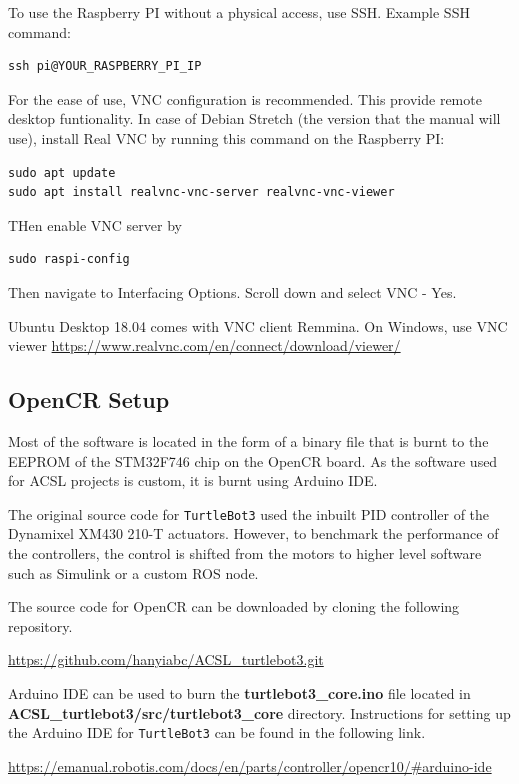 \documentclass[12]{article}
\begin{document}
To use the Raspberry PI without a physical access, use SSH. Example SSH command:

\begin{lstlisting}[style=bash]
ssh pi@YOUR_RASPBERRY_PI_IP
\end{lstlisting}

For the ease of use, VNC configuration is recommended. This provide remote desktop funtionality. In case of Debian Stretch (the version that the manual will use), install Real VNC by running this command on the Raspberry PI:
\begin{lstlisting}[style=bash]
sudo apt update
sudo apt install realvnc-vnc-server realvnc-vnc-viewer
\end{lstlisting}
THen enable VNC server by 
\begin{lstlisting}[style=bash]
sudo raspi-config
\end{lstlisting}
Then navigate to Interfacing Options.
Scroll down and select VNC - Yes.


Ubuntu Desktop 18.04 comes with VNC client Remmina.
On Windows, use VNC viewer
\url{https://www.realvnc.com/en/connect/download/viewer/}
\subsection{OpenCR Setup}

Most of the software is located in the form of a binary file that is burnt to the EEPROM of the STM32F746 chip on the OpenCR board. As the software used for ACSL projects is custom, it is burnt using Arduino IDE.

The original source code for \texttt{TurtleBot3} used the inbuilt PID controller of the Dynamixel XM430 210-T actuators. However, to benchmark the performance of the controllers, the control is shifted from the motors to higher level software such as Simulink or a custom ROS node.

The source code for OpenCR can be downloaded by cloning the following repository.

\url {https://github.com/hanyiabc/ACSL_turtlebot3.git}

Arduino IDE can be used to burn the \textbf{turtlebot3\_core.ino} file located in \textbf{ACSL\_turtlebot3/src/turtlebot3\_core} directory. Instructions for setting up the Arduino IDE for \texttt{TurtleBot3} can be found in the following link.

\url {https://emanual.robotis.com/docs/en/parts/controller/opencr10/#arduino-ide}
\newpage
\end{document}

